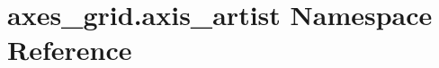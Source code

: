 \hypertarget{namespaceaxes__grid_1_1axis__artist}{}\section{axes\+\_\+grid.\+axis\+\_\+artist Namespace Reference}
\label{namespaceaxes__grid_1_1axis__artist}
